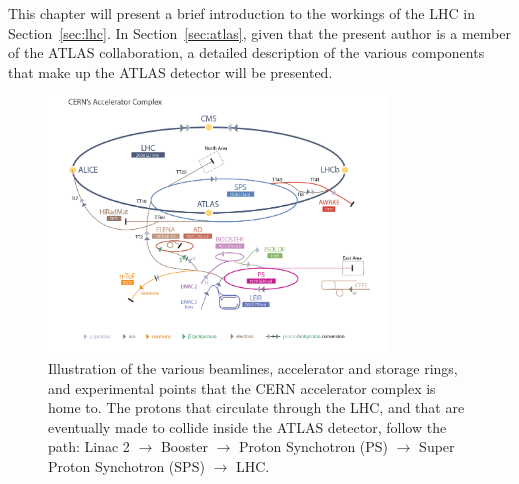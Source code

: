 This chapter will present a brief introduction to the workings of the LHC in Section~\ref{sec:lhc}.
In Section~\ref{sec:atlas}, given that the present author is a member of the ATLAS collaboration,
a detailed description of the various components that make up the ATLAS detector will be presented.

\begin{figure}[!htb]
    \begin{center}
        \includegraphics[width=0.8\textwidth]{figures/chapter2/cern_accelerator_complex2}
        \caption{
            Illustration of the various beamlines, accelerator and storage rings, and experimental
            points that the CERN accelerator complex is home to.
            The protons that circulate through the LHC, and that are eventually made to collide inside
            the ATLAS detector, follow the path: Linac 2 $\rightarrow$ Booster $\rightarrow$ Proton Synchotron (PS)
            $\rightarrow$ Super Proton Synchotron (SPS) $\rightarrow$ LHC.
        }
        \label{fig:cern_complex}
    \end{center}
\end{figure}



\FloatBarrier


\FloatBarrier
